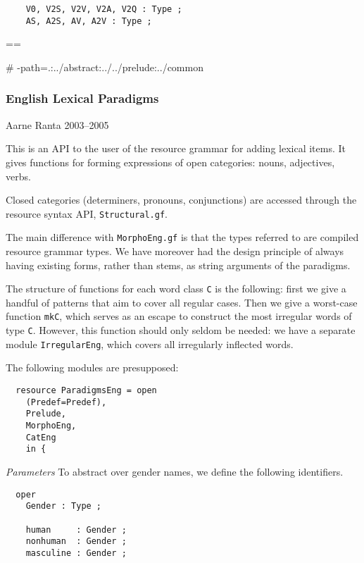 \documentclass[11pt,a4paper]{article}
\newcommand{\commOut}[1]{}
\newcommand{\subsubsubsection}[1]{\textit{#1}}
\begin{document}
\begin{verbatim}
    V0, V2S, V2V, V2A, V2Q : Type ;
    AS, A2S, AV, A2V : Type ;
\end{verbatim}


\commOut{Produced by 
gfdoc - a rudimentary GF document generator.
(c) Aarne Ranta (\htmladdnormallink{aarne@cs.chalmers.se}{mailto:aarne@cs.chalmers.se}) 2002 under GNU GPL.}

==

\# -path=.:../abstract:../../prelude:../common


\subsubsection{English Lexical Paradigms}
Aarne Ranta 2003--2005

This is an API to the user of the resource grammar 
for adding lexical items. It gives functions for forming
expressions of open categories: nouns, adjectives, verbs.

Closed categories (determiners, pronouns, conjunctions) are
accessed through the resource syntax API, \texttt{Structural.gf}. 

The main difference with \texttt{MorphoEng.gf} is that the types
referred to are compiled resource grammar types. We have moreover
had the design principle of always having existing forms, rather
than stems, as string arguments of the paradigms.

The structure of functions for each word class \texttt{C} is the following:
first we give a handful of patterns that aim to cover all
regular cases. Then we give a worst-case function \texttt{mkC}, which serves as an
escape to construct the most irregular words of type \texttt{C}.
However, this function should only seldom be needed: we have a
separate module \texttt{IrregularEng}, which covers all irregularly inflected
words.

The following modules are presupposed:

\begin{verbatim}
  resource ParadigmsEng = open 
    (Predef=Predef), 
    Prelude, 
    MorphoEng,
    CatEng
    in {
\end{verbatim}

\subsubsubsection{Parameters}
To abstract over gender names, we define the following identifiers.

\begin{verbatim}
  oper
    Gender : Type ; 
  
    human     : Gender ;
    nonhuman  : Gender ;
    masculine : Gender ;
\end{verbatim}
\end{document}
